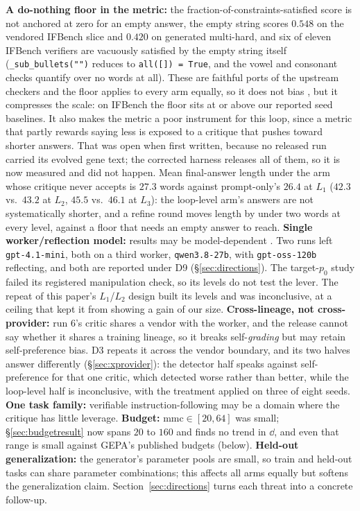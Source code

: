 \documentclass[11pt]{article}
\begin{document}
\textbf{A do-nothing floor in the
metric:} the fraction-of-constraints-satisfied score is not anchored at zero for an empty
answer, the empty string scores $0.548$ on the vendored IFBench slice \citep{pyatkin2025ifbench} and $0.420$ on
generated multi-hard, and six of eleven IFBench verifiers are vacuously satisfied by the empty
string itself (\texttt{\_sub\_bullets("")} reduces to \texttt{all([]) = True}, and the vowel and
consonant checks quantify over no words at all). These are faithful ports of the upstream checkers and the floor
applies to every arm equally, so it does not bias \dd, but it compresses the scale: on IFBench
the floor sits at or above our reported seed baselines. It also makes the metric a poor
instrument for this loop, since a metric that partly rewards saying less is exposed to a
critique that pushes toward shorter answers. That was open when first written, because no
released run carried its evolved gene text; the corrected harness releases all of them, so it
is now measured and did not happen. Mean final-answer length under the arm whose critique never
accepts is $27.3$ words against prompt-only's $26.4$ at $L_1$ ($42.3$ vs.\ $43.2$ at $L_2$,
$45.5$ vs.\ $46.1$ at $L_3$): the loop-level arm's answers are not systematically shorter, and
a refine round moves length by under two words at every level, against a floor that needs an
empty answer to reach. \textbf{Single worker/reflection
model:} results may be model-dependent \citep{huang2023cannot}. Two runs left
\texttt{gpt-4.1-mini}, both on a third worker, \texttt{qwen3.8-27b}, with \texttt{gpt-oss-120b}
reflecting, and both are reported under D9 (\S\ref{sec:directions}). The target-$p_0$ study failed
its registered manipulation check, so its levels do not test the lever. The repeat of this paper's
$L_1$/$L_2$ design built its levels and was inconclusive, at a ceiling that kept
it from showing a gain of our size. \textbf{Cross-lineage, not
cross-provider:} run 6's critic shares a vendor with the worker, and the release cannot say
whether it shares a training lineage, so it
breaks self-\emph{grading} but may retain self-preference bias. D3 repeats it across the vendor
boundary, and its two halves answer differently (\S\ref{sec:xprovider}): the detector half
speaks against self-preference for that one critic, which detected worse rather than better,
while the loop-level half is inconclusive, with the treatment applied on three of eight
seeds. \textbf{One task family:}
verifiable instruction-following may be a domain where the critique has little leverage.
\textbf{Budget:} $\mathrm{mmc}\in[20,64]$ was small; \S\ref{sec:budgetresult} now spans $20$
to $160$ and finds no trend in $\dd$, and even that range is small against GEPA's published
budgets (below). \textbf{Held-out generalization:} the
generator's parameter pools are small, so train and held-out tasks can share parameter
combinations; this affects all arms equally but softens the generalization claim.
Section~\ref{sec:directions} turns each threat into a concrete follow-up.
\end{document}
